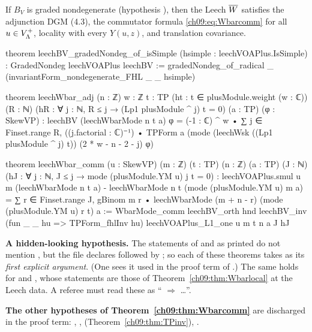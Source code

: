 \begin{theorem}\label{ch09:thm:leechcond}
If $B_V$ is graded nondegenerate (hypothesis ), then the Leech $\overline{W}$ satisfies the
adjunction DGM (4.3), the commutator formula \eqref{ch09:eq:Wbarcomm} for all $u\in V_{\Lambda}^{+}$, locality
with every $Y(u,z)$, and translation covariance.
\end{theorem}
\begin{leancode}
theorem leechBV_gradedNondeg_of_isSimple (hsimple : leechVOAPlus.IsSimple) :
    GradedNondeg leechVOAPlus leechBV :=
  gradedNondeg_of_radical _ (invariantForm_nondegenerate_FHL _ _ hsimple)

theorem leechWbar_adj (n : ℤ) {w : ℤ} {t : TP} (ht : t ∈ plusModule.weight (w : ℂ)) (R : ℕ)
    (hR : ∀ j : ℕ, R ≤ j → (Lp1 plusModule ^ j) t = 0) (a : TP) (φ : SkewVP) :
    leechBV (leechWbarMode n t a) φ = (-1 : ℂ) ^ w • ∑ j ∈ Finset.range R,
      ((j.factorial : ℂ)⁻¹) • TPForm a (mode (leechWsk ((Lp1 plusModule ^ j) t))
        (2 * w - n - 2 - j) φ)

theorem leechWbar_comm (u : SkewVP) (m : ℤ) (t : TP) (n : ℤ) (a : TP) (J : ℕ)
    (hJ : ∀ j : ℕ, J ≤ j → mode (plusModule.YM u) j t = 0) :
    leechVOAPlus.smul u m (leechWbarMode n t a) - leechWbarMode n t (mode (plusModule.YM u) m a)
      = ∑ r ∈ Finset.range J,
          gBinom m r • leechWbarMode (m + n - r) (mode (plusModule.YM u) r t) a :=
  WbarMode_comm leechBV_orth hnd leechBV_inv (fun _ _ hu => TPForm_fhlInv hu) leechVOAPlus_L1_one
    u m t n a J hJ
\end{leancode}
\begin{dictionary}
\textbf{A hidden-looking hypothesis.} The statements of  and
 as printed do not mention , but the file declares
 followed by ; so each
of these theorems takes  as its \emph{first explicit argument}. (One sees it used in the
proof term of .) The same holds for  and
, whose statements are those of Theorem~\ref{ch09:thm:Wbarlocal} at the
Leech data. A referee must read these as `` $\Rightarrow$ \dots''.

\textbf{The other hypotheses of Theorem~\ref{ch09:thm:Wbarcomm}} are discharged in the proof term:
, ,  (Theorem~\ref{ch09:thm:TPinv}),
.
\end{dictionary}

